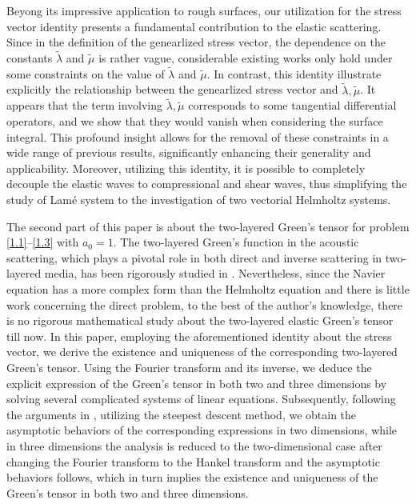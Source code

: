 \documentclass[final,reqno]{siamltex}
\begin{document}
Beyong its impressive application to rough surfaces, our utilization for the stress vector identity presents a fundamental contribution to the elastic scattering. Since in the definition of the genearlized stress vector, the dependence on the constants $\tilde\lambda$ and $\tilde\mu$ is rather vague, considerable existing works only hold under some constraints on the value of $\tilde\lambda$ and $\tilde\mu$. In contrast, this identity illustrate explicitly the relationship between the genearlized stress vector and $\tilde\lambda, \tilde\mu$. It appears that the term involving $\tilde\lambda, \tilde\mu$ corresponds to some tangential differential operators, and we show that they would vanish when considering the surface integral. This profound insight allows for the removal of these constraints in a wide range of previous results, significantly enhancing their generality and applicability. Moreover, utilizing this identity, it is possible to completely decouple the elastic waves to compressional and shear waves, thus simplifying the study of Lamé system to the investigation of two vectorial Helmholtz systems. 

The second part of this paper is about the two-layered Green's tensor for problem \eqref{1.1}--\eqref{1.3} with $a_0=1$. The two-layered Green's function in the acoustic scattering, which plays a pivotal role in both direct and inverse scattering in two-layered media, has been rigorously studied in \cite{HED05,NB84,LJ24,CP17}. Nevertheless, since the Navier equation has a more complex form than the Helmholtz equation and there is little work concerning the direct problem, to the best of the author's knowledge, there is no rigorous mathematical study about the two-layered elastic Green's tensor till now. In this paper, employing the aforementioned identity about the stress vector, we derive the existence and uniqueness of the corresponding two-layered Green's tensor. Using the Fourier transform and its inverse, we deduce the explicit expression of the Green's tensor in both two and three dimensions by solving several complicated systems of linear equations. Subsequently, following the arguments in \cite{HED05,NB84,LJ24,CP17}, utilizing the steepest descent method, we obtain the asymptotic behaviors of the corresponding expressions in two dimensions, while in three dimensions the analysis is reduced to the two-dimensional case after changing the Fourier transform to the Hankel transform and the asymptotic behaviors follows, which in turn implies the existence and uniqueness of the Green's tensor in both two and three dimensions. 
\end{document}
